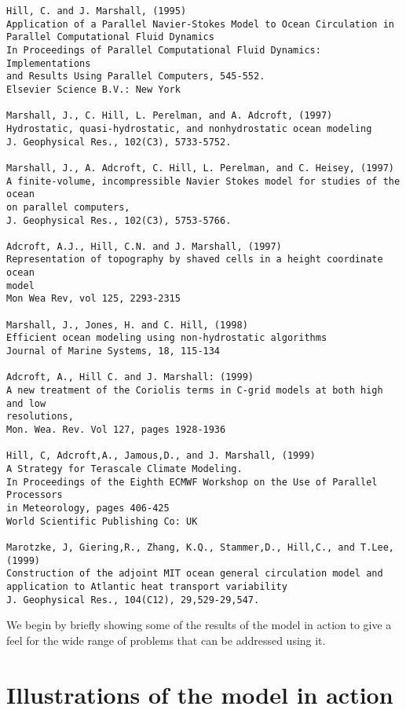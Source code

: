 \begin{verbatim}
Hill, C. and J. Marshall, (1995)
Application of a Parallel Navier-Stokes Model to Ocean Circulation in 
Parallel Computational Fluid Dynamics
In Proceedings of Parallel Computational Fluid Dynamics: Implementations 
and Results Using Parallel Computers, 545-552.
Elsevier Science B.V.: New York

Marshall, J., C. Hill, L. Perelman, and A. Adcroft, (1997)
Hydrostatic, quasi-hydrostatic, and nonhydrostatic ocean modeling
J. Geophysical Res., 102(C3), 5733-5752.

Marshall, J., A. Adcroft, C. Hill, L. Perelman, and C. Heisey, (1997)
A finite-volume, incompressible Navier Stokes model for studies of the ocean
on parallel computers,
J. Geophysical Res., 102(C3), 5753-5766.

Adcroft, A.J., Hill, C.N. and J. Marshall, (1997)
Representation of topography by shaved cells in a height coordinate ocean
model
Mon Wea Rev, vol 125, 2293-2315

Marshall, J., Jones, H. and C. Hill, (1998)
Efficient ocean modeling using non-hydrostatic algorithms
Journal of Marine Systems, 18, 115-134

Adcroft, A., Hill C. and J. Marshall: (1999)
A new treatment of the Coriolis terms in C-grid models at both high and low
resolutions,
Mon. Wea. Rev. Vol 127, pages 1928-1936

Hill, C, Adcroft,A., Jamous,D., and J. Marshall, (1999)
A Strategy for Terascale Climate Modeling.
In Proceedings of the Eighth ECMWF Workshop on the Use of Parallel Processors
in Meteorology, pages 406-425
World Scientific Publishing Co: UK

Marotzke, J, Giering,R., Zhang, K.Q., Stammer,D., Hill,C., and T.Lee, (1999)
Construction of the adjoint MIT ocean general circulation model and 
application to Atlantic heat transport variability
J. Geophysical Res., 104(C12), 29,529-29,547.

\end{verbatim}

We begin by briefly showing some of the results of the model in action to
give a feel for the wide range of problems that can be addressed using it.


\section{Illustrations of the model in action}

